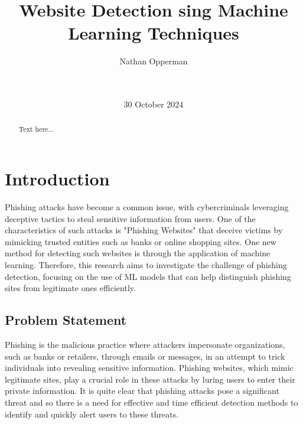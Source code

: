 \documentclass{sigkddExp}
\begin{document}
\title{Website Detection sing Machine Learning Techniques}


\author{
%
\alignauthor Nathan Opperman \\
       \\
       \\
}

\date{30 October 2024}
\maketitle

\begin{abstract}
Text here...
\end{abstract}

\section{Introduction}
Phishing attacks have become a common issue, with cybercriminals leveraging deceptive tactics to steal sensitive information from users. One of the characteristics of such attacks is "Phishing Websites" that deceive victims by mimicking trusted entities such as banks or online shopping sites. One new method for detecting such websites is through the application of machine learning. Therefore, this research aims to investigate the challenge of phishing detection, focusing on the use of ML models that can help distinguish phishing sites from legitimate ones efficiently.
\subsection{Problem Statement}
\label{prob_statement}
Phishing is the malicious practice where attackers impersonate organizations, such as banks or retailers, through emails or messages, in an attempt to trick individuals into revealing sensitive information. Phishing websites, which mimic legitimate sites, play a crucial role in these attacks by luring users to enter their private information. It is quite clear that phishing attacks pose a significant threat and so there is a need for effective and time efficient detection methods to identify and quickly alert users to these threats.
\end{document}
